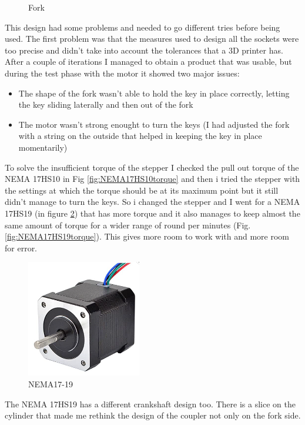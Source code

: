 \documentclass[a4paper,12pt]{article}
\begin{document}
\begin{multicols}{2}
\begin{figure}[H]
    \centering
    \caption{Fork}
    \label{fig:grab}
\end{figure}
This design had some problems and needed to go different tries before being used. The first problem was that the measures used to design all the sockets were too precise and didn't take into account the tolerances that a 3D printer has. After a couple of iterations I managed to obtain a product that was usable, but during the test phase with the motor it showed two major issues:
\begin{itemize}
    \item The shape of the fork wasn't able to hold the key in place correctly, letting the key sliding laterally and then out of the fork
    \item The motor wasn't strong enought to turn the keys (I had adjusted the fork with a string on the outside that helped in keeping the key in place momentarily)
\end{itemize}
To solve the insufficient torque of the stepper I checked the pull out torque of the NEMA 17HS10 in Fig \ref{fig:NEMA17HS10torque} and then i tried the stepper with the settings at which the torque should be at its maximum point but it still didn't manage to turn the keys. So i changed the stepper and I went for a NEMA 17HS19 (in figure \ref{fig:nema17-19}) that has more torque and it also manages to keep almost the same amount of torque for a wider range of round per minutes (Fig. \ref{fig:NEMA17HS19torque}). This gives more room to work with and more room for error.
\begin{figure}[H]
    \begin{center}
        \includegraphics[width=5cm]{images/nema17-19.PNG}
        \caption{NEMA17-19}
        \label{fig:nema17-19}
    \end{center}
\end{figure}
The NEMA 17HS19 has a different crankshaft design too. There is a slice on the cylinder that made me rethink the design of the coupler not only on the fork side.

\end{multicols}
\end{document}
